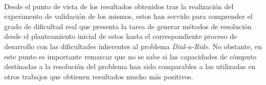 \documentclass{subfiles}
\begin{document}
      \paragraph{}
      Desde el punto de vista de los resultados obtenidos tras la realización del experimento de validación de los mismos, estos han servido para comprender el grado de dificultad real que presenta la tarea de generar métodos de resolución desde el planteamiento inicial de estos hasta el correspondiente proceso de desarrollo con las dificultades inherentes al problema \emph{Dial-a-Ride}. No obstante, en este punto es importante remarcar que no se sabe si las capacidades de cómputo destinadas a la resolución del problema han sido comparables a las utilizadas en otros trabajos que obtienen resultados mucho más positivos.

      \paragraph{}
\end{document}
